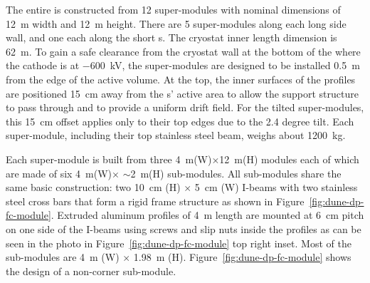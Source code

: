 The entire  is constructed from \num{12} super-modules with nominal dimensions of \SI{12}{\m} width and \SI{12}{\m} height. There are \num{5} super-modules along each long side wall, and one each along the short \endwall{}s.  
The cryostat inner length dimension is \SI{62}{\m}. To gain a safe clearance  from the cryostat wall at the bottom of the  where the cathode is at \SI{-600}{kV}, the \endwall {} super-modules are designed to be installed \SI{0.5}{\m} from the edge of the active volume. 
At the top, the inner surfaces of the  profiles are positioned \SI{15}{\cm} away from the s' active area to allow the  support structure to pass through and to provide a uniform drift field. For the tilted \endwall super-modules, this \SI{15}{\cm} offset applies only to their top edges due to the \num{2.4} degree tilt. Each super-module, including their top stainless steel beam, weighs about \SI{1200}{\kg}.


Each super-module is built from three \SI{4}{\m}(W)$\times$\SI{12}{m}(H) modules each of which are made of six \SI{4}{\m}(W)$\times$ $\sim$\SI{2}{m}(H) sub-modules. All sub-modules share the same basic construction: two \SI{10}{\cm} (H) $\times$ \SI{5}{\cm} (W)  I-beams with two stainless steel cross bars that form a rigid frame structure as shown in Figure~\ref{fig:dune-dp-fc-module}. 
Extruded aluminum profiles of \SI{4}{\m} length are mounted at \SI{6}{\cm} pitch on one side of the  I-beams using screws and slip nuts inside the profiles as can be seen in the photo in Figure~\ref{fig:dune-dp-fc-module} top right inset. Most of the sub-modules are \SI{4}{\m} (W) $\times$ \SI{1.98}{\m} (H). Figure~\ref{fig:dune-dp-fc-module} shows the design of a non-corner  sub-module. 

